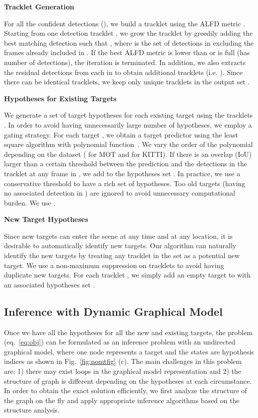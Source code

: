 \documentclass[10pt,twocolumn,letterpaper]{article}
\newcommand{\nosection}[1]{\vspace{2mm}\noindent\textbf{#1}}
\begin{document}
\nosection{Tracklet Generation}
\vspace{0.25em}

For all the confident detections (), we build a tracklet using the ALFD metric . Starting from one detection tracklet , we grow the tracklet by greedily adding the best matching detection  such that , where  is the set of detections in  excluding the frames already included in . If the best ALFD metric is lower than  or  is full (has  number of detections), the iteration is terminated. In addition, we also extracts the residual detections from each  in  to obtain additional tracklets (i.e. ). Since there can be identical tracklets, we keep only unique tracklets in the output set .

\nosection{Hypotheses for Existing Targets}
\vspace{0.25em}

We generate a set of target hypotheses  for each existing target  using the tracklets . In order to avoid having unnecessarily large number of hypotheses, we employ a gating strategy. For each target , we obtain a target predictor using the least square algorithm with polynomial function~\cite{leon1980linear}. We vary the order of the polynomial depending on the dataset ( for MOT and  for KITTI). If there is an overlap (IoU) larger than a certain threshold between the prediction and the detections in the tracklet  at any frame in , we add  to the hypotheses set . In practice, we use a conservative threshold  to have a rich set of hypotheses. Too old targets (having no associated detection in ) are ignored to avoid unnecessary computational burden. We use . 

\nosection{New Target Hypotheses}
\vspace{0.25em}

Since new targets can enter the scene at any time and at any location, it is desirable to automatically identify new targets. Our algorithm can naturally identify the new targets by treating any tracklet in the set  as a potential new target. We use a non-maximum suppression on tracklets to avoid having duplicate new targets. For each tracklet , we simply add an empty target  to  with an associated hypotheses set .

\subsection{Inference with Dynamic Graphical Model}
\label{sec:selection}

Once we have all the hypotheses for all the new and existing targets, the problem (eq.~\ref{eq:obj}) can be formulated as an inference problem with an undirected graphical model, where one node represents a target and the states are hypothesis indices as shown in Fig.~\ref{fig:nomtfig} (c). The main challenges in this problem are: 1) there may exist loops in the graphical model representation and 2) the structure of graph is different depending on the hypotheses at each circumstance. In order to obtain the exact solution efficiently, we first analyze the structure of the graph on the fly and apply appropriate inference algorithms based on the structure analysis.
\end{document}
